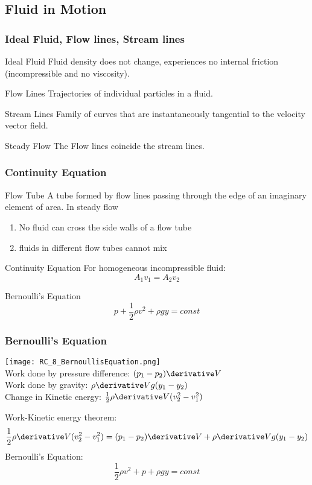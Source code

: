 \subsection{Fluid in Motion}
\begin{frame}
\frametitle{Ideal Fluid, Flow lines, Stream lines}
\begin{block}{Ideal Fluid}
Fluid \alert{density} does not change, experiences no internal \alert{friction} (incompressible and no viscosity).
\end{block}
\begin{block}{Flow Lines}
Trajectories of \alert{individual particles} in a fluid.
\end{block}
\begin{block}{Stream Lines}
Family of curves that are instantaneously \alert{tangential} to the \alert{velocity vector field}.
\end{block}
\begin{block}{Steady Flow}
The Flow lines coincide the stream lines.
\end{block}
\end{frame}
\begin{frame}
\frametitle{Continuity Equation}
\begin{block}{Flow Tube}
A tube formed by flow lines passing through the edge of an imaginary element of area. In steady flow
\begin{enumerate}
\item No fluid can \alert{cross} the side walls of a flow tube
\item fluids in different flow tubes cannot mix
\end{enumerate}
\end{block}
\begin{block}{Continuity Equation}
For homogeneous incompressible fluid:
\[A_1v_1=A_2v_2\]
\end{block}
\begin{block}{Bernoulli's Equation}
\[p+\frac{1}{2}\rho v^2+\rho gy=const\]
\end{block}
\end{frame}
\begin{frame}
\frametitle{Bernoulli's Equation}
\begin{multicols}{2}
\texttt{[image: RC\_8\_BernoullisEquation.png]}\\
Work done by pressure difference: $(p_1-p_2)\derivative V$\\
Work done by gravity: $\rho \derivative V g (y_1-y_2)$\\
Change in Kinetic energy: $\frac{1}{2}\rho\derivative V (v_2^2-v_1^2)$
\end{multicols}
Work-Kinetic energy theorem:
\[\frac{1}{2}\rho\derivative V (v_2^2-v_1^2)=(p_1-p_2)\derivative V+\rho \derivative V g (y_1-y_2)\]
Bernoulli's Equation:
\[\frac{1}{2}\rho v^2+p+\rho g y=const\]
\end{frame}
